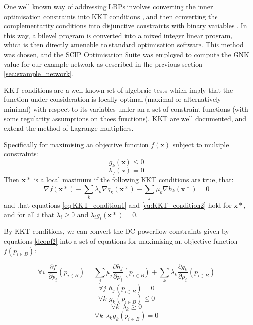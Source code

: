 One well known way of addressing LBPs involves converting the inner optimisation constraints into KKT conditions \cite{kuhn1951nonlinear}, and then converting the complementarity conditions into disjunctive constraints with binary variables \cite{Fortuny-Amat1981,Pineda2018}.
In this way, a bilevel program is converted into a mixed integer linear program, which is then directly amenable to standard optimisation software.
This method was chosen, and the SCIP Optimisation Suite was employed to compute the GNK value for our example network as described in the previous section \ref{sec:example_network}.

KKT conditions are a well known set of algebraic tests which imply that the function under consideration is locally optimal (maximal or alternatively minimal) with respect to its variables under an a set of constraint functions (with some regularity assumptions on thoes functions).
KKT are well documented, and extend the method of Lagrange multipliers.

Specifically for maximising an objective function $f(\mathbf{x})$ subject to multiple constraints:
\begin{equation}\label{eq:KKT_condition1} g_k(\mathbf{x})\le 0 \end{equation}
\begin{equation}\label{eq:KKT_condition2} h_j(\mathbf{x})=0 \end{equation}
Then $\mathbf{x}*$ is a local maximum if the following KKT conditions are true, that:
\begin{equation}\label{eq:KKT_conditions3} \nabla f(\mathbf{x}*) - \sum_k\lambda_k\nabla g_k(\mathbf{x}*) - \sum_j\mu_k\nabla h_k(\mathbf{x}*) =0\end{equation}
and that equations \ref{eq:KKT_condition1} and \ref{eq:KKT_condition2} hold for $\mathbf{x}*$, and for all $i$ that $\lambda_i\ge 0$ and $\lambda_ig_i(\mathbf{x}*)=0$.

By KKT conditions, we can convert the DC powerflow constraints given by equations \ref{dcopf2} into a set of equations for maximising an objective function $f(p_{i\in B})$:

\begin{equation}\forall i~~\frac{\partial f}{\partial p_i}(p_{i\in B})=\sum_j\mu_j\frac{\partial h_j}{\partial p_i}(p_{i\in B}) + \sum_k\lambda_k\frac{\partial g_k}{\partial p_i}(p_{i\in B})\end{equation}
\begin{equation}\forall j~~ h_j(p_{i\in B})=0\end{equation}
\begin{equation}\forall k~~ g_k(p_{i\in B})\le 0\end{equation}
\begin{equation}\forall k~~ \lambda_k \ge 0\end{equation}
\begin{equation}\label{eq:complementarity_constraint_KKT}\forall k~~ \lambda_kg_k(p_{i\in B}) = 0\end{equation}

